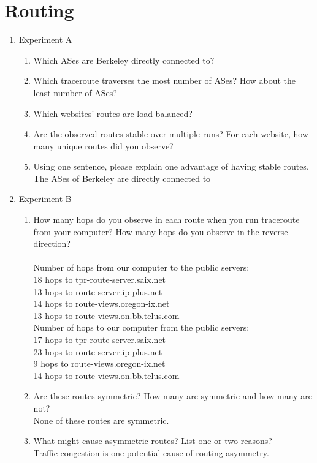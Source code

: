 \documentclass{article}
\begin{document}
\section{Routing}
\begin{enumerate}
    \item Experiment A
    \begin{enumerate}
        \item Which ASes are Berkeley directly connected to?
        \item Which traceroute traverses the most number of ASes? How about the least number of ASes?
        \item Which websites' routes are load-balanced?
        \item Are the observed routes stable over multiple runs? For each website, how many unique routes did you observe?
        \item Using one sentence, please explain one advantage of having stable routes.\\
            The ASes of Berkeley are directly connected to
    \end{enumerate}
    \item Experiment B
    \begin{enumerate}
    \item How many hops do you observe in each route when you run traceroute from your computer? How many hops do you observe in the reverse direction?\\ \\
    Number of hops from our computer to the public servers:\\
    18 hops to tpr-route-server.saix.net\\
    13 hops to route-server.ip-plus.net\\
    14 hops to route-views.oregon-ix.net\\
    13 hops to route-views.on.bb.telus.com\\
    Number of hops to our computer from the public servers:\\
    17 hops to tpr-route-server.saix.net\\
    23 hops to route-server.ip-plus.net\\
    9 hops to route-views.oregon-ix.net\\
    14 hops to route-views.on.bb.telus.com
    \item Are these routes symmetric? How many are symmetric and how many are not?\\
    None of these routes are symmetric.
    \item What might cause asymmetric routes? List one or two reasons? \\
    Traffic congestion is one potential cause of routing asymmetry.
    \end{enumerate}
\end{enumerate}
\end{document}
